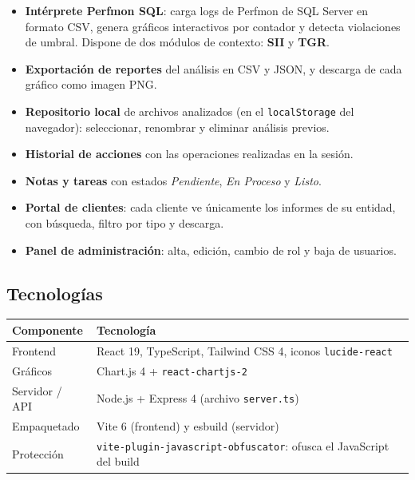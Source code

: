 \documentclass[11pt,a4paper]{article}
\newcommand{\ruta}[1]{\texttt{#1}}
\begin{document}
\begin{itemize}[leftmargin=*]
  \item \textbf{Intérprete Perfmon SQL}: carga logs de Perfmon de SQL Server en formato
        CSV, genera gráficos interactivos por contador y detecta violaciones de umbral.
        Dispone de dos módulos de contexto: \textbf{SII} y \textbf{TGR}.
  \item \textbf{Exportación de reportes} del análisis en CSV y JSON, y descarga de cada
        gráfico como imagen PNG.
  \item \textbf{Repositorio local} de archivos analizados (en el \texttt{localStorage}
        del navegador): seleccionar, renombrar y eliminar análisis previos.
  \item \textbf{Historial de acciones} con las operaciones realizadas en la sesión.
  \item \textbf{Notas y tareas} con estados \emph{Pendiente}, \emph{En Proceso} y \emph{Listo}.
  \item \textbf{Portal de clientes}: cada cliente ve únicamente los informes de su entidad,
        con búsqueda, filtro por tipo y descarga.
  \item \textbf{Panel de administración}: alta, edición, cambio de rol y baja de usuarios.
\end{itemize}

\subsection{Tecnologías}

\begin{center}
\begin{tabularx}{\linewidth}{lX}
\toprule
\textbf{Componente} & \textbf{Tecnología} \\
\midrule
Frontend        & React 19, TypeScript, Tailwind CSS 4, iconos \texttt{lucide-react} \\
Gráficos        & Chart.js 4 + \texttt{react-chartjs-2} \\
Servidor / API  & Node.js + Express 4 (archivo \ruta{server.ts}) \\
Empaquetado     & Vite 6 (frontend) y esbuild (servidor) \\
Protección      & \texttt{vite-plugin-javascript-obfuscator}: ofusca el JavaScript del build \\
\bottomrule
\end{tabularx}
\end{center}
\end{document}
